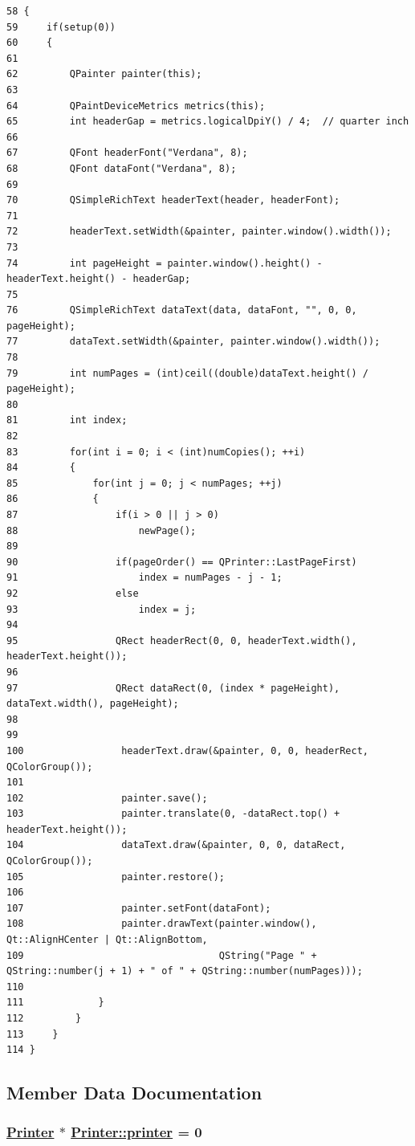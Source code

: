 \footnotesize\begin{verbatim}58 {
59     if(setup(0))
60     {
61 
62         QPainter painter(this);
63 
64         QPaintDeviceMetrics metrics(this);
65         int headerGap = metrics.logicalDpiY() / 4;  // quarter inch
66 
67         QFont headerFont("Verdana", 8);
68         QFont dataFont("Verdana", 8);
69     
70         QSimpleRichText headerText(header, headerFont);
71     
72         headerText.setWidth(&painter, painter.window().width());
73 
74         int pageHeight = painter.window().height() - headerText.height() - headerGap;
75 
76         QSimpleRichText dataText(data, dataFont, "", 0, 0, pageHeight);
77         dataText.setWidth(&painter, painter.window().width());
78 
79         int numPages = (int)ceil((double)dataText.height() / pageHeight);
80 
81         int index;
82 
83         for(int i = 0; i < (int)numCopies(); ++i)
84         {
85             for(int j = 0; j < numPages; ++j)
86             {
87                 if(i > 0 || j > 0)
88                     newPage();
89 
90                 if(pageOrder() == QPrinter::LastPageFirst)
91                     index = numPages - j - 1;
92                 else
93                     index = j;
94 
95                 QRect headerRect(0, 0, headerText.width(), headerText.height());
96 
97                 QRect dataRect(0, (index * pageHeight), dataText.width(), pageHeight);
98             
99 
100                 headerText.draw(&painter, 0, 0, headerRect, QColorGroup());
101 
102                 painter.save();
103                 painter.translate(0, -dataRect.top() + headerText.height());
104                 dataText.draw(&painter, 0, 0, dataRect, QColorGroup());
105                 painter.restore();
106 
107                 painter.setFont(dataFont);
108                 painter.drawText(painter.window(), Qt::AlignHCenter | Qt::AlignBottom,
109                                  QString("Page " + QString::number(j + 1) + " of " + QString::number(numPages)));
110 
111             }
112         }
113     }
114 }
\end{verbatim}\normalsize 




\subsection{Member Data Documentation}
\hypertarget{classPrinter_v0}{
\subsubsection[printer]{\setlength{\rightskip}{0pt plus 5cm}\hyperlink{classPrinter}{Printer} $\ast$ \hyperlink{classPrinter_v0}{Printer::printer} = 0}}
\label{classPrinter_v0}


